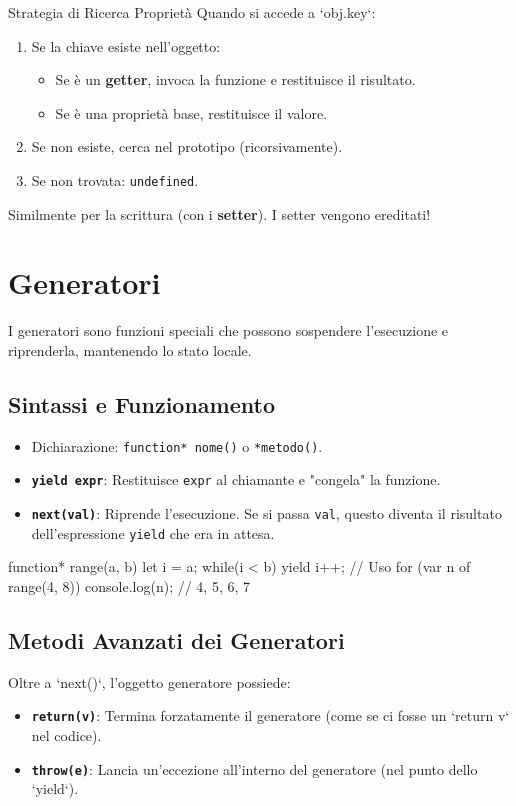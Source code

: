 \begin{algo}{Strategia di Ricerca Proprietà}
Quando si accede a `obj.key`:
\begin{enumerate}
    \item Se la chiave esiste nell'oggetto:
    \begin{itemize}
        \item Se è un \textbf{getter}, invoca la funzione e restituisce il risultato.
        \item Se è una proprietà base, restituisce il valore.
    \end{itemize}
    \item Se non esiste, cerca nel prototipo (ricorsivamente).
    \item Se non trovata: \texttt{undefined}.
\end{enumerate}
Similmente per la scrittura (con i \textbf{setter}). I setter vengono ereditati!
\end{algo}

\section{Generatori}
I generatori sono funzioni speciali che possono sospendere l'esecuzione e riprenderla, mantenendo lo stato locale.

\subsection{Sintassi e Funzionamento}
\begin{itemize}
    \item Dichiarazione: \texttt{function* nome()} o \texttt{*metodo()}.
    \item \textbf{\texttt{yield expr}}: Restituisce \texttt{expr} al chiamante e "congela" la funzione.
    \item \textbf{\texttt{next(val)}}: Riprende l'esecuzione. Se si passa \texttt{val}, questo diventa il risultato dell'espressione \texttt{yield} che era in attesa.
\end{itemize}

\begin{jsbox}[title={Esempio Range}]
function* range(a, b) {
    let i = a;
    while(i < b) yield i++;
}
// Uso
for (var n of range(4, 8)) { console.log(n); } // 4, 5, 6, 7
\end{jsbox}

\subsection{Metodi Avanzati dei Generatori}
Oltre a `next()`, l'oggetto generatore possiede:
\begin{itemize}
    \item \textbf{\texttt{return(v)}}: Termina forzatamente il generatore (come se ci fosse un `return v` nel codice).
    \item \textbf{\texttt{throw(e)}}: Lancia un'eccezione all'interno del generatore (nel punto dello `yield`).
\end{itemize}

